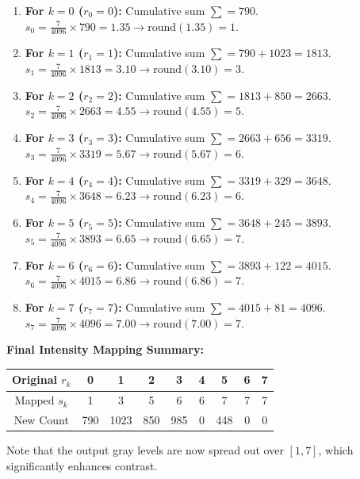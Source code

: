 \documentclass[12pt,a4paper]{article}
\renewcommand{\arraystretch}{1.45}
\begin{document}
\begin{tcolorbox}[examplebox, title={Discrete Histogram Equalization}]
\begin{enumerate}[leftmargin=*, itemsep=3.5pt]
  \item \textbf{For $k=0$ ($r_0 = 0$):}
    Cumulative sum $\sum = 790$.
    $s_0 = \frac{7}{4096} \times 790 = 1.35 \rightarrow \text{round}(1.35) = 1$.
  \item \textbf{For $k=1$ ($r_1 = 1$):}
    Cumulative sum $\sum = 790 + 1023 = 1813$.
    $s_1 = \frac{7}{4096} \times 1813 = 3.10 \rightarrow \text{round}(3.10) = 3$.
  \item \textbf{For $k=2$ ($r_2 = 2$):}
    Cumulative sum $\sum = 1813 + 850 = 2663$.
    $s_2 = \frac{7}{4096} \times 2663 = 4.55 \rightarrow \text{round}(4.55) = 5$.
  \item \textbf{For $k=3$ ($r_3 = 3$):}
    Cumulative sum $\sum = 2663 + 656 = 3319$.
    $s_3 = \frac{7}{4096} \times 3319 = 5.67 \rightarrow \text{round}(5.67) = 6$.
  \item \textbf{For $k=4$ ($r_4 = 4$):}
    Cumulative sum $\sum = 3319 + 329 = 3648$.
    $s_4 = \frac{7}{4096} \times 3648 = 6.23 \rightarrow \text{round}(6.23) = 6$.
  \item \textbf{For $k=5$ ($r_5 = 5$):}
    Cumulative sum $\sum = 3648 + 245 = 3893$.
    $s_5 = \frac{7}{4096} \times 3893 = 6.65 \rightarrow \text{round}(6.65) = 7$.
  \item \textbf{For $k=6$ ($r_6 = 6$):}
    Cumulative sum $\sum = 3893 + 122 = 4015$.
    $s_6 = \frac{7}{4096} \times 4015 = 6.86 \rightarrow \text{round}(6.86) = 7$.
  \item \textbf{For $k=7$ ($r_7 = 7$):}
    Cumulative sum $\sum = 4015 + 81 = 4096$.
    $s_7 = \frac{7}{4096} \times 4096 = 7.00 \rightarrow \text{round}(7.00) = 7$.
\end{enumerate}

\par\noindent\textbf{Final Intensity Mapping Summary:}
\begin{center}
  \small
  {\renewcommand{\arraystretch}{1.65}%
\begin{tabular}{|c|c|c|c|c|c|c|c|c|}
\hline
Original $r_k$ & 0 & 1 & 2 & 3 & 4 & 5 & 6 & 7 \\[4pt]
\hline
Mapped $s_k$   & 1 & 3 & 5 & 6 & 6 & 7 & 7 & 7 \\[4pt]
\hline
New Count      & 790 & 1023 & 850 & 985 & 0 & 448 & 0 & 0 \\
\hline
\end{tabular}}
\end{center}
Note that the output gray levels are now spread out over $[1,7]$, which significantly enhances contrast.
\end{tcolorbox}
\end{document}
